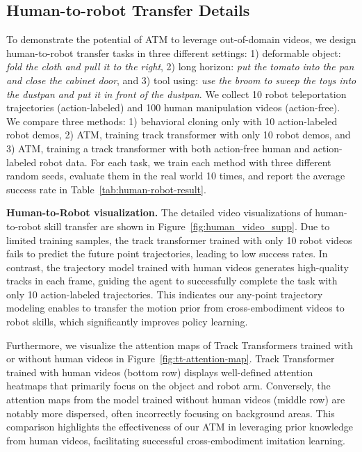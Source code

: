 \subsection{Human-to-robot Transfer Details}
To demonstrate the potential of ATM to leverage out-of-domain videos, we design human-to-robot transfer tasks in three different settings: 1) deformable object: \textit{fold the cloth and pull it to the right}, 2) long horizon: \textit{put the tomato into the pan and close the cabinet door}, and 3) tool using: \textit{use the broom to sweep the toys into the dustpan and put it in front of the dustpan}.
We collect 10 robot teleportation trajectories (action-labeled) and 100 human manipulation videos (action-free). We compare three methods: 1) behavioral cloning only with 10 action-labeled robot demos, 2) ATM, training track transformer with only 10 robot demos, and 3) ATM, training a track transformer with both action-free human and action-labeled robot data.
For each task, we train each method with three different random seeds, evaluate them in the real world 10 times, and report the average success rate in Table~\ref{tab:human-robot-result}.

\noindent\textbf{Human-to-Robot visualization.}
The detailed video visualizations of human-to-robot skill transfer are shown in Figure~\ref{fig:human_video_supp}. Due to limited training samples, the track transformer trained with only 10 robot videos fails to predict the future point trajectories, leading to low success rates. In contrast, the trajectory model trained with human videos generates high-quality tracks in each frame, guiding the agent to successfully complete the task with only 10 action-labeled trajectories. This indicates our any-point trajectory modeling enables to transfer the motion prior from cross-embodiment videos to robot skills, which significantly improves policy learning.

Furthermore, we visualize the attention maps of Track Transformers trained with or without human videos in Figure~\ref{fig:tt-attention-map}. Track Transformer trained with human videos (bottom row) displays well-defined attention heatmaps that primarily focus on the object and robot arm. Conversely, the attention maps from the model trained without human videos (middle row) are notably more dispersed, often incorrectly focusing on background areas. This comparison highlights the effectiveness of our ATM in leveraging prior knowledge from human videos, facilitating successful cross-embodiment imitation learning.


